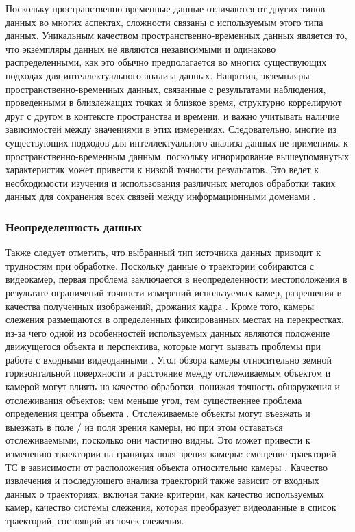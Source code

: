Поскольку пространственно-временные данные отличаются от других типов данных во многих аспектах, сложности связаны с используемым этого типа данных. Уникальным качеством пространственно-временных данных является то, что экземпляры данных не являются независимыми и одинаково распределенными, как это обычно предполагается во многих существующих подходах для интеллектуального анализа данных. Напротив, экземпляры пространственно-временных данных, связанные с результатами наблюдения, проведенными в близлежащих точках и близкое время, структурно коррелируют друг с другом в контексте пространства и времени, и важно учитывать наличие зависимостей между значениями в этих измерениях. Следовательно, многие из существующих подходов для интеллектуального анализа данных не применимы к пространственно-временным данным, поскольку игнорирование вышеупомянутых характеристик может привести к низкой точности результатов. Это ведет к необходимости изучения и использования различных методов обработки таких данных для сохранения всех связей между информационными доменами \cite{article:1_survey_stdm}.

\subsubsection{Неопределенность данных}

Также следует отметить, что выбранный тип источника данных приводит к трудностям при обработке. Поскольку данные о траектории собираются с видеокамер, первая проблема заключается в неопределенности местоположения в результате ограничений точности измерений используемых камер, разрешения и качества полученных изображений, дрожания кадра \cite{article:4_detect_eatp}. Кроме того, камеры слежения размещаются в определенных фиксированных местах на перекрестках, из-за чего одной из особенностей используемых данных являются положение движущегося объекта и перспектива, которые могут вызвать проблемы при работе с входными видеоданными \cite{article:6_survey_anom_det_rtuvs}. Угол обзора камеры относительно земной горизонтальной поверхности и расстояние между отслеживаемым объектом и камерой могут влиять на качество обработки, понижая точность обнаружения и отслеживания объектов: чем меньше угол, тем существеннее проблема определения центра объекта \cite{article:4_detect_eatp}\cite{article:9_trb_vc_aev_sc}. Отслеживаемые объекты могут въезжать и выезжать в поле / из поля зрения камеры, но при этом оставаться отслеживаемыми, посколько они частично видны. Это может привести к изменению траектории на границах поля зрения камеры: смещение траекторий ТС в зависимости от расположения объекта относительно камеры \cite{article:4_detect_eatp}. Качество извлечения и последующего анализа траекторий также зависит от входных данных о траекториях, включая такие критерии, как качество используемых камер, качество системы слежения, которая преобразует видеоданные в список траекторий, состоящий из точек слежения.

